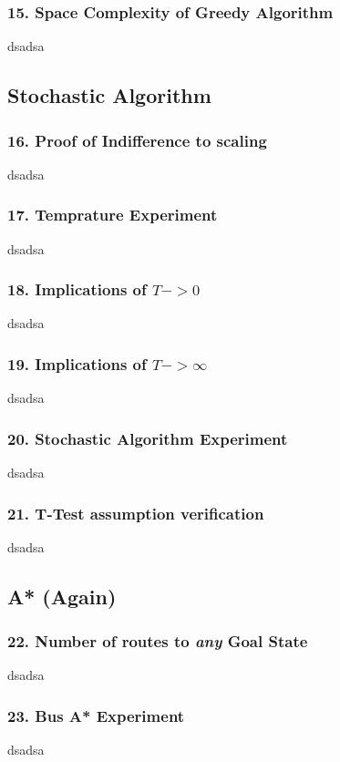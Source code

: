 \documentclass{article}
\begin{document}
\subsubsection*{15. Space Complexity of Greedy Algorithm}
dsadsa

\subsection*{Stochastic Algorithm}
\subsubsection*{16. Proof of Indifference to scaling}
dsadsa

\subsubsection*{17. Temprature Experiment}
dsadsa

\subsubsection*{18. Implications of $T -> 0$}
dsadsa

\subsubsection*{19. Implications of $T -> \infty$}
dsadsa

\subsubsection*{20. Stochastic Algorithm Experiment}
dsadsa

\subsubsection*{21. T-Test assumption verification}
dsadsa

\subsection*{A* (Again)}
\subsubsection*{22. Number of routes to \emph{any} Goal State}
dsadsa

\subsubsection*{23. Bus A* Experiment}
dsadsa
\end{document}
